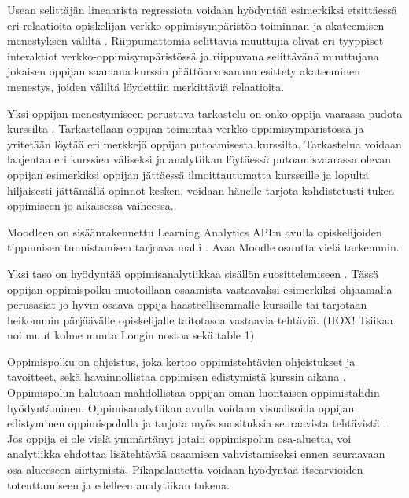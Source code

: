 Usean selittäjän lineaarista regressiota voidaan hyödyntää esimerkiksi etsittäessä eri relaatioita opiskelijan verkko-oppimisympäristön toiminnan ja akateemisen menestyksen väliltä \citep{agudo-peregrinaCanWePredict2014}. Riippumattomia selittäviä muuttujia olivat eri tyyppiset interaktiot verkko-oppimisympäristössä ja riippuvana selittävänä muuttujana jokaisen oppijan saamana kurssin päättöarvosanana esittety akateeminen menestys, joiden väliltä löydettiin merkittäviä relaatioita.

Yksi oppijan menestymiseen perustuva tarkastelu on onko oppija vaarassa pudota kurssilta \citep{oliveSupervisedLearningFramework2018, suhonenUsingMoodleData2019}. Tarkastellaan oppijan toimintaa verkko-oppimisympäristössä ja yritetään löytää eri merkkejä oppijan putoamisesta kurssilta. Tarkastelua voidaan laajentaa eri kurssien väliseksi \citep{kinnari-korpelaOppimisanalytiikallaTehokkaampaanOhjaukseen2020} ja analytiikan löytäessä putoamisvaarassa olevan oppijan esimerkiksi oppijan jättäessä ilmoittautumatta kursseille ja lopulta hiljaisesti jättämällä opinnot kesken, voidaan hänelle tarjota kohdistetusti tukea oppimiseen jo aikaisessa vaiheessa.

Moodleen on sisäänrakennettu Learning Analytics API:n avulla opiskelijoiden tippumisen tunnistamisen tarjoava malli \citep{oliveSupervisedLearningFramework2018,monllaoAnalyticsAPIMoodleDocs2021}. \color{red} Avaa Moodle osuutta vielä tarkemmin. \color{black}

Yksi taso on hyödyntää oppimisanalytiikkaa sisällön suosittelemiseen \citep{longPenetratingFogAnalytics2011,siemensLearningAnalyticsEmergence2013}. Tässä oppijan oppimispolku muotoillaan osaamista vastaavaksi esimerkiksi ohjaamalla perusasiat jo hyvin osaava oppija haasteellisemmalle kurssille tai tarjotaan heikommin pärjäävälle opiskelijalle taitotasoa vastaavia tehtäviä. \color{red}(HOX! Tsiikaa noi muut kolme muuta Longin nostoa sekä table 1)\color{black}

Oppimispolku on ohjeistus, joka kertoo oppimistehtävien ohjeistukset ja tavoitteet, sekä havainnollistaa oppimisen edistymistä kurssin aikana \citep{toivolaFlippedLearningKaanteinen2017}. Oppimispolun halutaan mahdollistaa oppijan oman luontaisen oppimistahdin hyödyntäminen. Oppimisanalytiikan avulla voidaan visualisoida oppijan edistyminen oppimispolulla ja tarjota myös suosituksia seuraavista tehtävistä \citep{longPenetratingFogAnalytics2011}. Jos oppija ei ole vielä ymmärtänyt jotain oppimispolun osa-aluetta, voi analytiikka ehdottaa lisätehtävää osaamisen vahvistamiseksi ennen seuraavaan osa-alueeseen siirtymistä. Pikapalautetta voidaan hyödyntää itsearvioiden toteuttamiseen ja edelleen analytiikan tukena.


